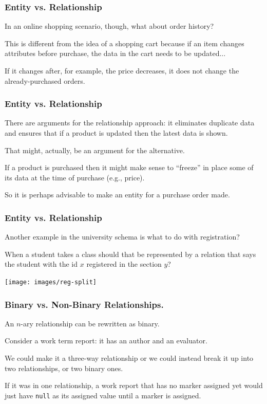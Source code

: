 \begin{frame}
\frametitle{Entity vs. Relationship}

In an online shopping scenario, though, what about order history? 

This is different from the idea of a shopping cart because if an item changes attributes before purchase, the data in the cart needs to be updated...

If it changes after, for example, the price decreases, it does not change the already-purchased orders.

\end{frame}



\begin{frame}
\frametitle{Entity vs. Relationship}

There are arguments for the relationship approach: it eliminates duplicate data and ensures that if a product is updated then the latest data is shown. 

That might, actually, be an argument for the alternative. 

If a product is purchased then it might make sense to ``freeze'' in place some of its data at the time of purchase (e.g., price).

So it is perhaps advisable to make an entity for a purchase order made. 

\end{frame}



\begin{frame}
\frametitle{Entity vs. Relationship}

Another example in the university schema is what to do with registration? 

When a student takes a class should that be represented by a relation that says the student with the id $x$ registered in the section $y$? 


\begin{center}
	\texttt{[image: images/reg-split]}
\end{center}

\end{frame}



\begin{frame}
\frametitle{Binary vs. Non-Binary Relationships.}

An $n$-ary relationship can be rewritten as binary.

Consider a work term report: it has an author and an evaluator. 

We could make it a three-way relationship or we could instead break it up into two relationships, or two binary ones.

If it was in one relationship, a work report that has no marker assigned yet would just have \texttt{null} as its assigned value until a marker is assigned.  


\end{frame}



